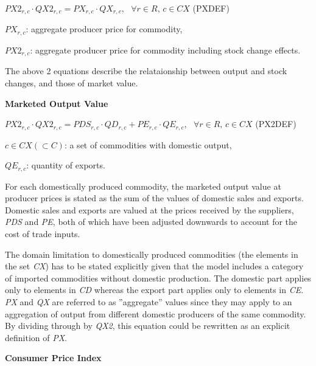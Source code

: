 \documentclass[10pt,a4paper,titlepage,dvipdfmx]{book}
\begin{document}
\begin{center}$PX2_{r,c}\cdot QX2_{r,c}=PX_{r,c}\cdot QX_{r,c},\,\,\,\,\forall r\in R,\,c\in CX$ (PXDEF)
\end{center}

\begin{flushleft}
$PX_{r,c}$: aggregate producer price for commodity,

$PX2_{r,c}$: aggregate producer price for commodity including stock change effects.
\end{flushleft}

The above 2 equations describe the relataionship between output and stock changes, and those of market value.

\begin{flushleft}\textbf{Marketed Output Value}\end{flushleft}


\begin{center}$PX2_{r,c}\cdot QX2_{r,c}=PDS_{r,c}\cdot QD_{r,c}+PE_{r,c}\cdot QE_{r,c},\,\,\,\,\forall r\in R,\,c\in CX$ (PX2DEF)
\end{center}

\begin{flushleft}
$c\in CX\left(\subset C\right)$: a set of commodities with domestic output,

$QE_{r,c}$: quantity of exports.
\end{flushleft}
For each domestically produced commodity, the marketed output value at producer prices is stated as the sum of the values of domestic sales and exports. Domestic sales and exports are valued at the prices received by the suppliers, \textit{PDS} and \textit{PE}, both of which have been adjusted downwards to account for the cost of trade inputs. 

The domain limitation to domestically produced commodities (the elements in the set \textit{CX}) has to be stated explicitly given that the model includes a category of imported commodities without domestic production. The domestic part applies only to elements in \textit{CD} whereas the export part applies only to elements in \textit{CE}. \textit{PX} and \textit{QX} are referred to as ''aggregate'' values since they may apply to an aggregation of output from different domestic producers of the same commodity. By dividing through by \textit{QX2}, this equation could be rewritten as an explicit definition of \textit{PX}.

\begin{flushleft}\textbf{Consumer Price Index}\end{flushleft}
\end{document}
